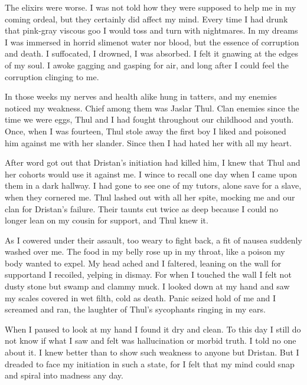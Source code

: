 \documentclass
  [a4paper,
   12pt,
   oneside
  ]%
  {article}
\begin{document}
The elixirs were worse. 
I was not told how they were supposed to help me in my coming ordeal, but they certainly did affect my mind. 
Every time I had drunk that pink-gray viscous goo I would toss and turn with nightmares. 
In my dreams I was immersed in horrid slime\dash not water nor blood, but the essence of corruption and death. 
I suffocated, I drowned, I was absorbed. 
I felt it gnawing at the edges of my soul.
I awoke gagging and gasping for air, and long after I could feel the corruption clinging to me. 

In those weeks my nerves and health alike hung in tatters, and my enemies noticed my weakness.
Chief among them was Jaslar Thul. 
Clan enemies since the time we were eggs, Thul and I had fought throughout our childhood and youth. 
Once, when I was fourteen, Thul stole away the first boy I liked and poisoned him against me with her slander. 
Since then I had hated her with all my heart. 

After word got out that Dristan's initiation had killed him, I knew that Thul and her cohorts would use it against me. 
I wince to recall one day when I came upon them in a dark hallway. 
I had gone to see one of my tutors, alone save for a \human slave, when they cornered me.\index{\human} 
Thul lashed out with all her spite, mocking me and our clan for Dristan's failure. 
Their taunts cut twice as deep because I could no longer lean on my cousin for support, and Thul knew it. 

As I cowered under their assault, too weary to fight back, a fit of nausea suddenly washed over me. 
The food in my belly rose up in my throat, like a poison my body wanted to expel. 
My head ached and I faltered, leaning on the wall for support\dash and I recoiled, yelping in dismay. 
For when I touched the wall I felt not dusty stone but swamp and clammy muck. 
I looked down at my hand and saw my scales covered in wet filth, cold as death. 
Panic seized hold of me and I screamed and ran, the laughter of Thul's sycophants ringing in my ears. 

When I paused to look at my hand I found it dry and clean.
To this day I still do not know if what I saw and felt was hallucination or morbid truth. 
I told no one about it. 
I knew better than to show such weakness to anyone but Dristan. 
But I dreaded to face my initiation in such a state, for I felt that my mind could snap and spiral into madness any day. 
\end{document}
